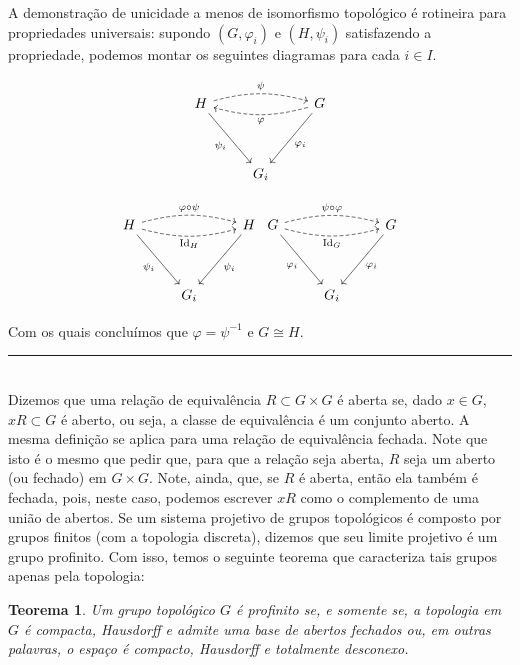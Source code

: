 \documentclass[12pt,a4paper]{article}
\newtheorem{thrm}[mydef]{Teorema}
\def\eop{\hfill\rule{2.5mm}{2.5mm} \\ }
\theoremstyle{definition}
\begin{document}
A demonstração de unicidade a menos de isomorfismo topológico é rotineira para propriedades universais: supondo $(G, \varphi_i)$ e $(H, \psi_i)$ satisfazendo a propriedade, podemos montar os seguintes diagramas para cada $i\in I$.

$$\begin{tikzcd}
    H  \arrow[dashrightarrow, bend left=15]{rr}{\psi} \arrow{rdd}[swap]{\psi_i} & & G \arrow[dashrightarrow, bend left=15]{ll}{\varphi} \arrow{ldd}{\varphi_{i}} \\
    & & \\
    & G_i &   
\end{tikzcd}$$

$$\begin{tikzcd}
    H  \arrow[dashrightarrow, bend left=15]{rr}{\varphi \circ \psi} \arrow{rdd}[swap]{\psi_i} \arrow[dashrightarrow, bend right=15]{rr}[swap]{\text{Id}_{H}}  & & H \arrow{ldd}{\psi_{i}} \\
    & & \\
    & G_i &   
\end{tikzcd} \begin{tikzcd}
    G  \arrow[dashrightarrow, bend left=15]{rr}{\psi \circ \varphi} \arrow{rdd}[swap]{\varphi_i}  \arrow[dashrightarrow, bend right=15]{rr}[swap]{\text{Id}_{G}}  & & G \arrow{ldd}{\varphi_{i}} \\
    & & \\
    & G_i &   
\end{tikzcd}$$

Com os quais concluímos que $\varphi=\psi^{-1}$ e $G\cong H$. \eop

Dizemos que uma relação de equivalência $R\subset G\times G$ é aberta se, dado $x\in G$, $xR\subset G$ é aberto, ou seja, a classe de equivalência é um conjunto aberto. A mesma definição se aplica para uma relação de equivalência fechada. Note que isto é o mesmo que pedir que, para que a relação seja aberta, $R$ seja um aberto (ou fechado) em $G\times G$. Note, ainda, que, se $R$ é aberta, então ela também é fechada, pois, neste caso, podemos escrever $xR$ como o complemento de uma união de abertos. Se um sistema projetivo de grupos topológicos é composto por grupos finitos (com a topologia discreta), dizemos que seu limite projetivo é um grupo profinito. Com isso, temos o seguinte teorema que caracteriza tais grupos apenas pela topologia:

\begin{thrm}

    Um grupo topológico $G$ é profinito se, e somente se, a topologia em $G$ é compacta, Hausdorff e admite uma base de abertos fechados ou, em outras palavras, o espaço é compacto, Hausdorff e totalmente desconexo. 

\end{thrm}
\end{document}

